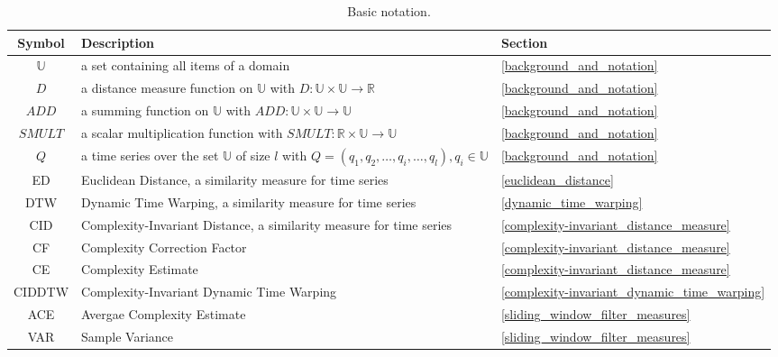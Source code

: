 \begin{table}[H]
    \begin{center}
        \begin{tabularx}{\textwidth}{c X l}
            \textbf{Symbol} \qquad & \textbf{Description} & \qquad \textbf{Section}\\
            \hline
            $\mathbb{U}$ & a set containing all items of a domain & \qquad \ref{background_and_notation}\\
            $D$ & a distance measure function on $\mathbb{U}$ with $D: \mathbb{U} \times \mathbb{U} \to \mathbb{R}$
                & \qquad \ref{background_and_notation}\\
            $ADD$ & a summing function on $\mathbb{U}$ with $ADD: \mathbb{U} \times \mathbb{U} \to \mathbb{U}$
                & \qquad \ref{background_and_notation}\\
            $SMULT$ & a scalar multiplication function with $SMULT: \mathbb{R} \times \mathbb{U} \to \mathbb{U}$
                & \qquad \ref{background_and_notation}\\
            $Q$ & a time series over the set $\mathbb{U}$ of size $l$ with
                $Q = (q_1, q_2, \dots, q_i, \dots, q_l), q_i \in \mathbb{U}$ & \qquad \ref{background_and_notation}\\
            ED & Euclidean Distance, a similarity measure for time series & \qquad \ref{euclidean_distance}\\
            DTW & Dynamic Time Warping, a similarity measure for time series & \qquad \ref{dynamic_time_warping}\\
            CID & Complexity-Invariant Distance, a similarity measure for time series
                & \qquad \ref{complexity-invariant_distance_measure}\\
            CF & Complexity Correction Factor & \qquad \ref{complexity-invariant_distance_measure}\\
            CE & Complexity Estimate & \qquad \ref{complexity-invariant_distance_measure}\\
            CIDDTW & Complexity-Invariant Dynamic Time Warping
                & \qquad \ref{complexity-invariant_dynamic_time_warping}\\
            ACE & Avergae Complexity Estimate & \qquad \ref{sliding_window_filter_measures}\\
            VAR & Sample Variance & \qquad \ref{sliding_window_filter_measures}\\
        \end{tabularx}
    \end{center}
    \caption{Basic notation.}
	\label{tab:notation}
\end{table}




